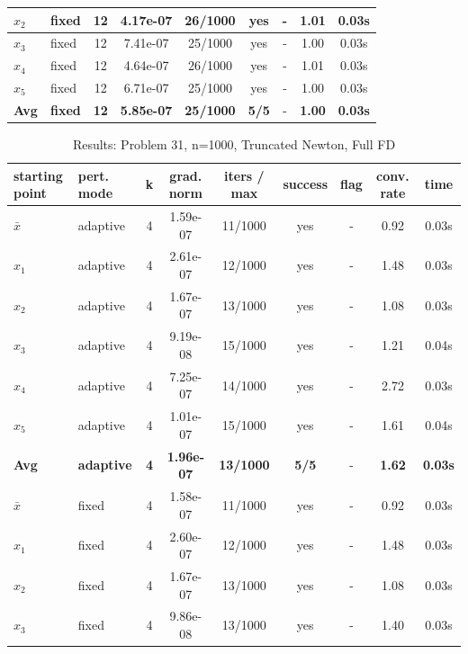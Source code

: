 \begin{longtable}{|l|l|c|c|c|c|c|c|c|}
\hline
$x_2$ & fixed & 12 & 4.17e-07 & 26/1000 & yes & - & 1.01 & 0.03s \\
\hline
$x_3$ & fixed & 12 & 7.41e-07 & 25/1000 & yes & - & 1.00 & 0.03s \\
\hline
$x_4$ & fixed & 12 & 4.64e-07 & 26/1000 & yes & - & 1.01 & 0.03s \\
\hline
$x_5$ & fixed & 12 & 6.71e-07 & 25/1000 & yes & - & 1.00 & 0.03s \\
\hline
\hline\hline
\textbf{Avg} & \textbf{fixed} & \textbf{12} & \textbf{5.85e-07} & \textbf{25/1000} & \textbf{5/5} & - & \textbf{1.00} & \textbf{0.03s} \\
\hline\hline
\end{longtable}


\begin{longtable}{|l|l|c|c|c|c|c|c|c|}
\caption{Results: Problem 31, n=1000, Truncated Newton, Full FD} \\
\hline
\textbf{starting point} & \textbf{pert. mode} & \textbf{k} & \textbf{grad. norm} & \textbf{iters / max} & \textbf{success} & \textbf{flag} & \textbf{conv. rate} & \textbf{time} \\
\hline
\endfirsthead
\endhead
\endfoot
\hline
\endlastfoot
$\bar{x}$ & adaptive & 4 & 1.59e-07 & 11/1000 & yes & - & 0.92 & 0.03s \\
\hline
$x_1$ & adaptive & 4 & 2.61e-07 & 12/1000 & yes & - & 1.48 & 0.03s \\
\hline
$x_2$ & adaptive & 4 & 1.67e-07 & 13/1000 & yes & - & 1.08 & 0.03s \\
\hline
$x_3$ & adaptive & 4 & 9.19e-08 & 15/1000 & yes & - & 1.21 & 0.04s \\
\hline
$x_4$ & adaptive & 4 & 7.25e-07 & 14/1000 & yes & - & 2.72 & 0.03s \\
\hline
$x_5$ & adaptive & 4 & 1.01e-07 & 15/1000 & yes & - & 1.61 & 0.04s \\
\hline
\hline\hline
\textbf{Avg} & \textbf{adaptive} & \textbf{4} & \textbf{1.96e-07} & \textbf{13/1000} & \textbf{5/5} & - & \textbf{1.62} & \textbf{0.03s} \\
\hline\hline
\hline
$\bar{x}$ & fixed & 4 & 1.58e-07 & 11/1000 & yes & - & 0.92 & 0.03s \\
\hline
$x_1$ & fixed & 4 & 2.60e-07 & 12/1000 & yes & - & 1.48 & 0.03s \\
\hline
$x_2$ & fixed & 4 & 1.67e-07 & 13/1000 & yes & - & 1.08 & 0.03s \\
\hline
$x_3$ & fixed & 4 & 9.86e-08 & 13/1000 & yes & - & 1.40 & 0.03s \\

\end{longtable}
